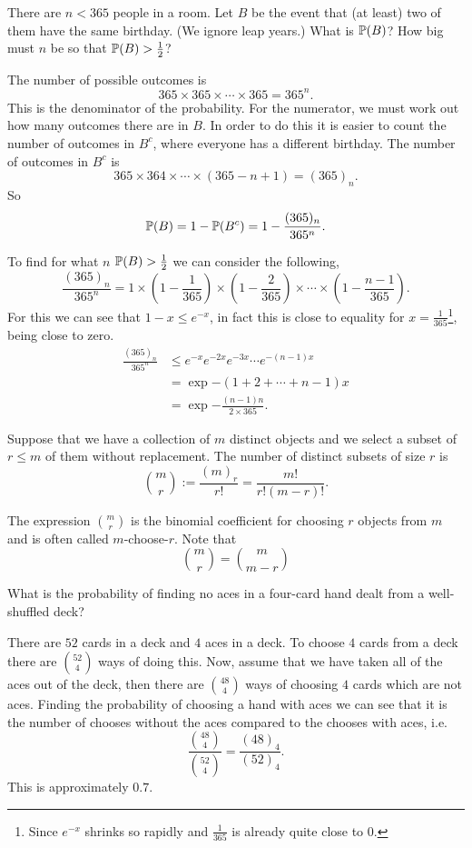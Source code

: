 \documentclass[10pt, a4paper]{article}
\begin{document}
\begin{example}
    There are $n < 365$ people in a room. Let $B$ be the event that (at least) two of them have the same birthday. (We ignore leap years.) What is $\P(B)$? How big must $n$ be so that $\P(B) > \frac{1}{2}$?

    The number of possible outcomes is
    \[
    365 \times 365 \times \dotsi \times 365 = 365 ^ n.
    \]
    This is the denominator of the probability. For the numerator, we must work out how many outcomes there are in $B$. In order to do this it is easier to count the number of outcomes in $B ^ c$, where everyone has a different birthday. The number of outcomes in $B ^ c$ is
    \[
    365 \times 364 \times \dotsi \times (365 - n + 1) = (365)_n.
    \]
    So
    \[
    \P(B) = 1 - \P(B ^ c) = 1 - \frac{(365)_n}{365 ^ n}.
    \]

    To find for what $n$ $\P(B) > \frac{1}{2}$ we can consider the following,
    \[
    \frac{(365)_n}{365 ^ n} = 1 \times \left(1 - \frac{1}{365}\right) \times \left(1 - \frac{2}{365}\right) \times \dotsi \times \left(1 - \frac{n - 1}{365}\right).
    \]
    For this we can see that $1 - x \leq e ^ {-x}$, in fact this is close to equality for $x = \frac{1}{365}$\footnote{Since $e^{-x}$ shrinks so rapidly and $\frac{1}{365}$ is already quite close to $0$.}, being close to zero.
    \begin{align*}
        \frac{(365)_n}{365 ^ n} &\leq e ^ {-x} e ^ {-2x} e ^ {-3x} \dotsi e^{-(n - 1)x} \\
        &= \exp{-(1 + 2 + \dotsi + n - 1)x} \\
        &= \exp{-\frac{(n - 1)n}{2 \times 365}}.
    \end{align*}
\end{example}

\begin{countprinc}
    Suppose that we have a collection of $m$ distinct objects and we select a subset of $r \leq m$ of them without replacement. The number of distinct subsets of size $r$ is
    \[
    \binom{m}{r} := \frac{(m)_r}{r!} = \frac{m!}{r!(m - r)!}.
    \]
\end{countprinc}

The expression $\binom{m}{r}$ is the binomial coefficient for choosing $r$ objects from $m$ and is often called $m$-choose-$r$. Note that
\[
\binom{m}{r} = \binom{m}{m - r}
\]

\begin{example}
    What is the probability of finding no aces in a four-card hand dealt from a well-shuffled deck?

    There are $52$ cards in a deck and $4$ aces in a deck. To choose $4$ cards from a deck there are $\binom{52}{4}$ ways of doing this. Now, assume that we have taken all of the aces out of the deck, then there are $\binom{48}{4}$ ways of choosing $4$ cards which are not aces. Finding the probability of choosing a hand with aces we can see that it is the number of chooses without the aces compared to the chooses with aces, i.e.
    \[
    \frac{\binom{48}{4}}{\binom{52}{4}} = \frac{(48)_4}{(52)_4}.
    \]
    This is approximately $0.7$.
\end{example}
\end{document}
